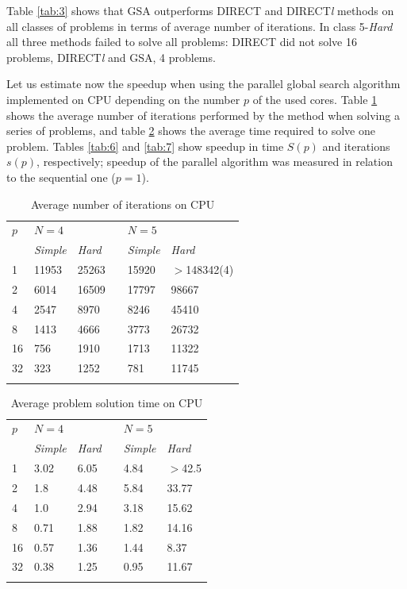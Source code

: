 \documentclass[smallcondensed]{svjour3}     %
\begin{document}
Table \ref{tab:3} shows that GSA outperforms DIRECT and DIRECT\textit{l} methods on all classes of problems in terms of average number of iterations. In class 5-\textit{Hard} all three methods failed to solve all problems: DIRECT did not solve 16 problems, DIRECT\textit{l} and GSA, 4 problems.

Let us estimate now the speedup when using the parallel global search algorithm implemented on CPU depending on the number $p$ of the used cores. Table \ref{tab:4} shows the average number of iterations performed by the method when solving a series of problems, and table \ref{tab:5} shows the average time required to solve one problem. Tables \ref{tab:6} and \ref{tab:7} show speedup in time $S(p)$ and iterations $s(p)$, respectively; speedup of the parallel algorithm was measured in relation to the sequential one ($p=1$).

\begin{table}
	\caption{Average number of iterations on CPU}
	\label{tab:4}
	\center
	\begin{tabular}{llllll}
		\hline\noalign{\smallskip}
		$p$ & \multicolumn{2}{l}{ $N=4$ } & & \multicolumn{2}{l}{$N=5$} \\
		\noalign{\smallskip} \cline{2-3} \cline{5-6} \noalign{\smallskip}
		 & \textit{Simple} & \textit{Hard} & & \textit{Simple} & \textit{Hard}  \\
		\noalign{\smallskip} \hline \noalign{\smallskip}
		1 &	11953 &	25263 & &	15920 &	$>$148342(4) \\
		2 &	6014 &	16509 & & 17797 &	98667 \\
		4 &	2547 &	8970 & &	8246 &	45410 \\
		8 &	1413 &	4666 & &	3773 &	26732 \\
		16 &	756 &	1910 & &	1713 &	11322 \\
		32 &	323 &	1252 & &	781 &	11745 \\
		\noalign{\smallskip}\hline
	\end{tabular}
\end{table}

\begin{table}
	\caption{Average problem solution time on CPU}
	\label{tab:5}
	\center
	\begin{tabular}{llllll}
		\hline\noalign{\smallskip}
		$p$ & \multicolumn{2}{l}{ $N=4$ } & & \multicolumn{2}{l}{$N=5$} \\
		\noalign{\smallskip} \cline{2-3} \cline{5-6} \noalign{\smallskip}
		 & \textit{Simple} & \textit{Hard} & & \textit{Simple} & \textit{Hard}  \\
		\noalign{\smallskip} \hline \noalign{\smallskip}
		1 &	3.02 &	6.05 & &	4.84 &	$>$42.5 \\
		2 &	1.8 &	4.48 & &	5.84 &	33.77 \\
		4 &	1.0 &	2.94 & &	3.18 &	15.62 \\
		8 &	0.71 &	1.88 & &	1.82 &	14.16 \\
		16 &	0.57 &	1.36 & &	1.44 &	8.37 \\
		32 &	0.38 &	1.25 & &	0.95 &	11.67 \\
		\noalign{\smallskip}\hline
	\end{tabular}
\end{table}
\end{document}
